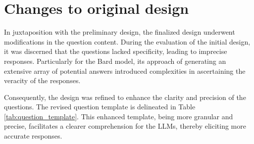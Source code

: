 \documentclass[twocolumn,11pt]{report}
\begin{document}
\section{Changes to original design}

In juxtaposition with the preliminary design, the finalized design underwent modifications in the question content. During the evaluation of the initial design, it was discerned that the questions lacked specificity, leading to imprecise responses. Particularly for the Bard model, its approach of generating an extensive array of potential answers introduced complexities in ascertaining the veracity of the responses.

Consequently, the design was refined to enhance the clarity and precision of the questions. The revised question template is delineated in Table \ref{tab:question_template}. This enhanced template, being more granular and precise, facilitates a clearer comprehension for the LLMs, thereby eliciting more accurate responses.
\end{document}
